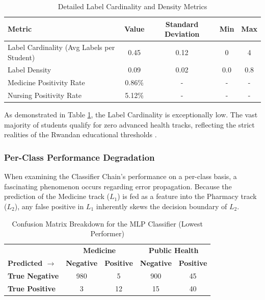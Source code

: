\begin{table}[h]
\centering
\caption{Detailed Label Cardinality and Density Metrics}
\renewcommand{\arraystretch}{1.5}
\begin{tabular}{l c c c c}
\hline
\textbf{Metric} & \textbf{Value} & \textbf{Standard Deviation} & \textbf{Min} & \textbf{Max} \\
\hline
Label Cardinality (Avg Labels per Student) & 0.45 & 0.12 & 0 & 4 \\
Label Density & 0.09 & 0.02 & 0.0 & 0.8 \\
Medicine Positivity Rate & 0.86\% & - & - & - \\
Nursing Positivity Rate & 5.12\% & - & - & - \\
\hline
\end{tabular}
\label{tab:extended_metrics}
\end{table}

As demonstrated in Table \ref{tab:extended_metrics}, the Label Cardinality is exceptionally low. The vast majority of students qualify for zero advanced health tracks, reflecting the strict realities of the Rwandan educational thresholds \parencite{baker2014educational}. 

\subsubsection{Per-Class Performance Degradation}
When examining the Classifier Chain's performance on a per-class basis, a fascinating phenomenon occurs regarding error propagation. Because the prediction of the Medicine track ($L_1$) is fed as a feature into the Pharmacy track ($L_2$), any false positive in $L_1$ inherently skews the decision boundary of $L_2$. 

\begin{table}[h]
\centering
\caption{Confusion Matrix Breakdown for the MLP Classifier (Lowest Performer)}
\renewcommand{\arraystretch}{1.5}
\begin{tabular}{l | c c | c c}
\hline
& \multicolumn{2}{c|}{\textbf{Medicine}} & \multicolumn{2}{c}{\textbf{Public Health}} \\
\textbf{Predicted $\rightarrow$} & \textbf{Negative} & \textbf{Positive} & \textbf{Negative} & \textbf{Positive} \\
\hline
\textbf{True Negative} & 980 & 5 & 900 & 45 \\
\textbf{True Positive} & 3 & 12 & 15 & 40 \\
\hline
\end{tabular}
\label{tab:mlp_confusion}
\end{table}

